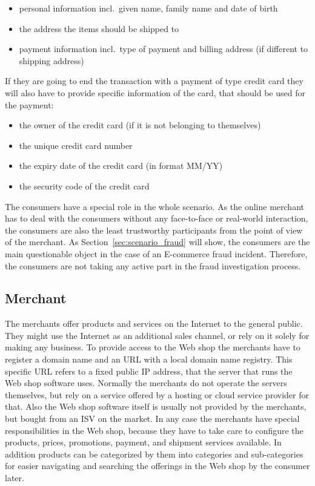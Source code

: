 \begin{itemize}
		\item personal information incl.\ given name, family name and date of birth
		\item the address the items should be shipped to
		\item payment information incl.\ type of payment and billing address (if different to shipping address)
\end{itemize}

If they are going to end the transaction with a payment of type credit card they will also have to provide specific information of the card, that should be used for the payment:\@

\begin{itemize}
		\item the owner of the credit card (if it is not belonging to themselves)
		\item the unique credit card number
		\item the expiry date of the credit card (in format MM/YY)
		\item the security code of the credit card
\end{itemize}

The consumers have a special role in the whole scenario. As the online merchant has to deal with the consumers without any face-to-face or real-world interaction, the consumers are also the least trustworthy participants from the point of view of the merchant. As Section~\ref{sec:scenario_fraud} will show, the consumers are the main questionable object in the case of an \gls{E-commerce} fraud incident. Therefore, the consumers are not taking any active part in the fraud investigation process.


\subsection{Merchant}
\label{subsec:stakeholder_merchant}

The merchants offer products and services on the Internet to the general public. They might use the Internet as an additional sales channel, or rely on it solely for making any business. To provide access to the Web shop the merchants have to register a domain name and an \gls{URL} with a local domain name registry. This specific \gls{URL} refers to a fixed public \gls{IP} address, that the server that runs the Web shop software uses. Normally the merchants do not operate the servers themselves, but rely on a service offered by a hosting or cloud service provider for that. Also the Web shop software itself is usually not provided by the merchants, but bought from an \gls{ISV} on the market. In any case the merchants have special responsibilities in the Web shop, because they have to take care to configure the products, prices, promotions, payment, and shipment services available. In addition products can be categorized by them into categories and sub-categories for easier navigating and searching the offerings in the Web shop by the consumer later. \\

